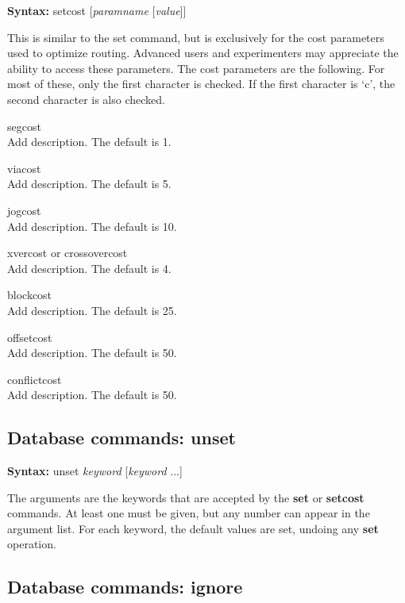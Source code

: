 {\bf Syntax:} {\vt setcost} [{\it paramname} [{\it value\/}]]

This is similar to the {\vt set} command, but is exclusively for the
cost parameters used to optimize routing.  Advanced users and
experimenters may appreciate the ability to access these parameters. 
The cost parameters are the following.  For most of these, only the
first character is checked.  If the first character is `{\vt c}', the
second character is also checked.

\begin{description}
\item{\vt segcost}\\
Add description.
The default is 1.

\item{\vt viacost}\\
Add description.
The default is 5.

\item{\vt jogcost}\\
Add description.
The default is 10.

\item{\vt xvercost} or {\vt crossovercost}\\
Add description.
The default is 4.

\item{\vt blockcost}\\
Add description.
The default is 25.

\item{\vt offsetcost}\\
Add description.
The default is 50.

\item{\vt conflictcost}\\
Add description.
The default is 50.
\end{description}

\subsection{Database commands: {\vt unset}}

{\bf Syntax:} {\vt unset} {\it keyword} [{\it keyword} ...]

The arguments are the keywords that are accepted by the {\bf set} or
{\bf setcost} commands.  At least one must be given, but any number
can appear in the argument list.  For each keyword, the default
values are set, undoing any {\bf set} operation.


\subsection{Database commands: {\vt ignore}}

